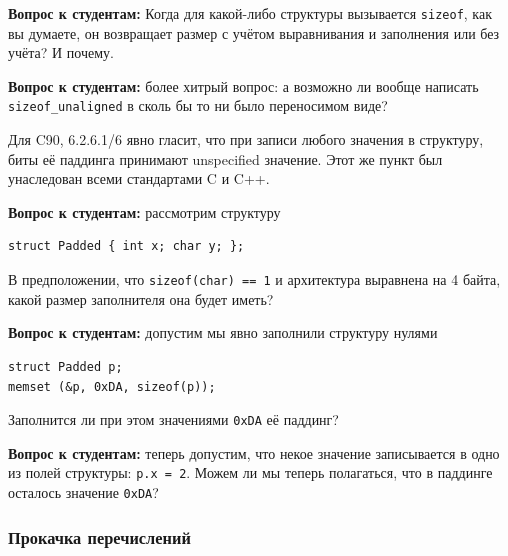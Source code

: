 \documentclass[a4paper,12pt,oneside]{article}
\newif\ifanswers
\begin{document}
\textbf{Вопрос к студентам:} Когда для какой-либо структуры вызывается \lstinline!sizeof!, как вы думаете, он возвращает размер с учётом выравнивания и заполнения или без учёта? И почему.

\ifanswers
Правильный ответ: с учётом. Потому что иначе например не работала бы идиома \lstinline!malloc (sizeof(widget))! -- здесь выделялось бы динамической памяти меньше, чем реально нужно.
\fi

\textbf{Вопрос к студентам:} более хитрый вопрос: а возможно ли вообще написать \lstinline!sizeof_unaligned! в сколь бы то ни было переносимом виде?

\ifanswers
Правильный ответ автору неизвестен. Скорее всего нет, но никто не исключает наличие какого-нибудь особо хитрого трюка.
\fi

Для C90, 6.2.6.1/6 явно гласит, что при записи любого значения в структуру, биты её паддинга принимают unspecified значение. Этот же пункт был унаследован всеми стандартами C и C++.

\textbf{Вопрос к студентам:} рассмотрим структуру

\begin{lstlisting}
struct Padded { int x; char y; };
\end{lstlisting}

В предположении, что \lstinline!sizeof(char) == 1! и архитектура выравнена на 4 байта, какой размер заполнителя она будет иметь?

\ifanswers
Правильный ответ: 3 байта.
\fi

\textbf{Вопрос к студентам:} допустим мы явно заполнили структуру нулями

\begin{lstlisting}
struct Padded p;
memset (&p, 0xDA, sizeof(p));
\end{lstlisting}

Заполнится ли при этом значениями \lstinline!0xDA! её паддинг?

\ifanswers
Верный ответ: да, несомненно.
\fi

\textbf{Вопрос к студентам:} теперь допустим, что некое значение записывается в одно из полей структуры: \lstinline!p.x = 2!. Можем ли мы теперь полагаться, что в паддинге осталось значение \lstinline!0xDA!?

\ifanswers
Верный ответ: нет, потому что см. выше, при записи в поля, паддинг unspecified.
\fi

\subsubsection{Прокачка перечислений}\label{EnumClass}
\end{document}
